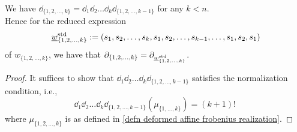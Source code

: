 \begin{lemma}\label{lemma- demazure standard rex}
    We have $\dd_{\{1,2, \ldots ,k\}}=\dd_1\dd_2\ldots \dd_k \dd_{\{1,2,\ldots , k-1\}}$ for any $k<n.$ \\Hence for the reduced expression
    $$\underline{w}^{\operatorname{std}}_{\{1,2, \ldots,k\}}:=(s_1, s_2, \ldots, s_k, s_1,s_2, \ldots , s_{k-1}, \ldots, s_1,s_2,s_1)$$
    of $w_{\{1,2, \ldots,k\}}$, we have that
    $\partial_{\{1,2, \ldots ,k\}}=\partial_{\underline{w}^{\operatorname{std}}_{\{1,2, \ldots,k\}}}$.
\end{lemma}
\begin{proof}
    It suffices to show that $\dd_1\dd_2\ldots \dd_k \dd_{\{1,2,\ldots , k-1\}}$ satisfies the normalization condition, i.e., 
    $$\dd_1\dd_2\ldots \dd_k \dd_{\{1,2,\ldots , k-1\}}(\mu_{\{1,\ldots,k\}})= (k+1)!\;$$
    where $\mu_{\{1,2,\ldots , k\}}$ is as defined in \cref{defn deformed affine frobenius realization}.
    

\end{proof}
